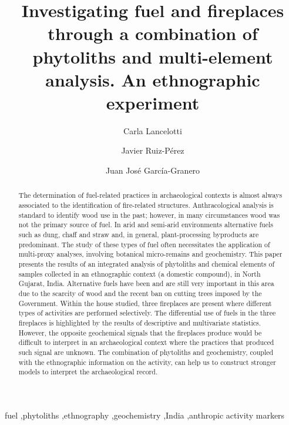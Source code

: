\documentclass[authoryear,preprint,review,12pt]{elsarticle}
\begin{document}
\begin{frontmatter}

\title{Investigating fuel and fireplaces through a combination of phytoliths and multi-element analysis. An ethnographic experiment}

\author[label1,label2]{Carla Lancelotti}
\author[label1,label3]{Javier Ruiz-Pérez}
\author[label1,label4]{Juan José García-Granero}
\address[label1]{CaSEs - Complexity and Socio-Ecological Dynamics Research Group}
\address[label2]{Department of Humanities, Pompeu Fabra University, Barcelona (Spain)}
\address[label3]{Department of Animal and Plant Biology and Ecology, Faculty of Biosciences, Autonomous University of Barcelona, Bellaterra (Spain)}
\address[label4]{Department of Archaeology and Anthropology, Institució Milà i Fontanals, Spanish National Research Council (CSIC)}


\begin{abstract}
The determination of fuel-related practices in archaeological contexts is almost always associated to the identification of fire-related structures. Anthracological analysis is standard to identify wood use in the past; however, in many circumstances wood was not the primary source of fuel. In arid and semi-arid environments alternative fuels such as dung, chaff and straw and, in general, plant-processing byproducts are predominant. The study of these types of fuel often necessitates the application of multi-proxy analyses, involving botanical micro-remains and geochemistry.
This paper presents the results of an integrated analysis of phytoliths and chemical elements of samples collected in an ethnographic context (a domestic compound), in North Gujarat, India. Alternative fuels have been and are still very important in this area due to the scarcity of wood and the recent ban on cutting trees imposed by the Government. Within the house studied, three fireplaces are present where different types of activities are performed selectively. The differential use of fuels in the three fireplaces is highlighted by the results of descriptive and multivariate statistics. However, the opposite geochemical signals that the fireplaces produce would be difficult to interpret in an archaeological context where the practices that produced such signal are unknown. The combination of phytoliths and geochemistry, coupled with the ethnographic information on the activity, can help us to construct stronger models to interpret the archaeological record.
\end{abstract}

\begin{keyword}
fuel \sep phytoliths \sep ethnography \sep geochemistry \sep India \sep anthropic activity markers
\end{keyword}

\end{frontmatter}
\end{document}
